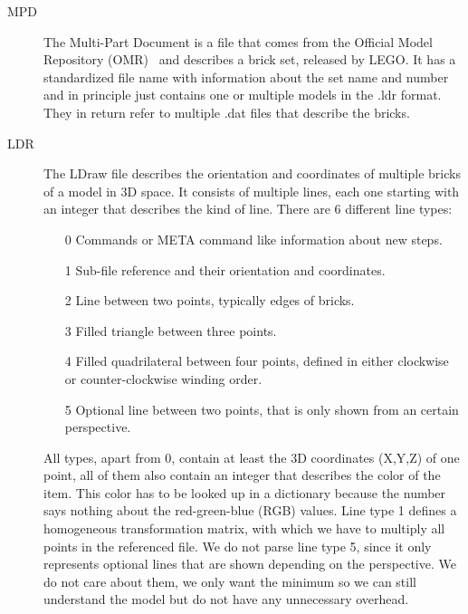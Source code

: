 \begin{description}
	\item[MPD]
	The Multi-Part Document is a file that comes from the Official Model Repository (OMR)~\cite{omr} and describes a brick set, released by LEGO. It has a standardized file name with information about the set name and number and in principle just contains one or multiple models in the .ldr format. They in return refer to multiple .dat files that describe the bricks.
	
	\item[LDR]
	The LDraw file describes the orientation and coordinates of multiple bricks of a model in 3D space. It consists of multiple lines, each one starting with an integer that describes the kind of line. There are 6 different line types: 
	\begin{enumerate}
		\item[0] Commands or META command like information about new steps.
		\item[1] Sub-file reference and their orientation and coordinates.
		\item[2] Line between two points, typically edges of bricks.
		\item[3] Filled triangle between three points.
		\item[4] Filled quadrilateral between four points, defined in either clockwise or counter-clockwise winding order.
		\item[5] Optional line between two points, that is only shown from an certain perspective.
	\end{enumerate}
	All types, apart from 0, contain at least the 3D coordinates (X,Y,Z) of one point, all of them also contain an integer that describes the color of the item. This color has to be looked up in a dictionary because the number says nothing about the red-green-blue (RGB) values. Line type 1 defines a homogeneous transformation matrix, with which we have to multiply all points in the referenced file.\newline
	We do not parse line type 5, since it only represents optional lines that are shown depending on the perspective. We do not care about them, we only want the minimum so we can still understand the model but do not have any unnecessary overhead.
	
\end{description}


